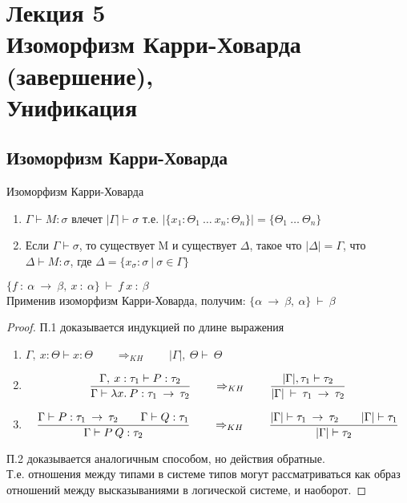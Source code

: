 \section{Лекция 5 \\ Изоморфизм Карри-Ховарда (завершение), \\Унификация}
		\subsection{Изоморфизм Карри-Ховарда}
	\begin{definition}Изоморфизм Карри-Ховарда\end{definition}

	\begin{enumerate}
		\item $\Gamma\vdash M:\sigma$ влечет $|\Gamma|\vdash \sigma$ т.е. $|\{x_1:\Theta_1\:\hdots \:x_n:\Theta_n\}|=\{\Theta_1\:\hdots\:\Theta_n\}$
		\item Если $\Gamma\vdash\sigma$, то существует M и существует $\Delta$, такое что $|\Delta|=\Gamma$, что $\Delta \vdash M: \sigma$, где $\Delta=\{x_{\sigma} : \sigma\:|\:\sigma\in\Gamma  \}$
	\end{enumerate}
	\begin{example}
	$\{f\: :\:\alpha\:\rightarrow\:\beta,\:x\: :\:\alpha\}\:\vdash\:f\:x\::\:\beta$ \\Применив изоморфизм Карри-Ховарда, получим: $\{\alpha\:\rightarrow\:\beta,\:\alpha\}\:\vdash\:\beta$
	\end{example}
	\begin{proof}
		\par П.1 доказывается индукцией по длине выражения
			\begin{enumerate}
				\item $\Gamma,\:x:\Theta\vdash x:\Theta \qquad \Rightarrow_{KH} \qquad |\Gamma|,\:\Theta\vdash\:\Theta$
				\item $${\Gamma,\:x:\tau_1\vdash P:\tau_2 \over \Gamma \vdash \lambda x.\:P:\tau_1\:\rightarrow\:\tau_2} \qquad \Rightarrow_{KH} \qquad {|\Gamma|, \tau_1\vdash\tau_2\over |\Gamma|\:\vdash\:\tau_1\:\rightarrow\:\tau_2}$$
				\item $${\Gamma\vdash P:\tau_1\:\rightarrow\:\tau_2 \hspace{2em} \Gamma\vdash Q:\tau_1 \over \Gamma \vdash P\:Q:\tau_2} \qquad \Rightarrow_{KH} \qquad {|\Gamma|\vdash \tau_1\:\rightarrow\:\tau_2 \hspace{2em} |\Gamma|\vdash \tau_1 \over |\Gamma| \vdash \tau_2}$$
			\end{enumerate}
\par П.2 доказывается аналогичным способом, но действия обратные.\\
Т.е. отношения между типами в системе типов могут рассматриваться как образ отношений между высказываниями в логической системе, и наоборот.
\end{proof}

